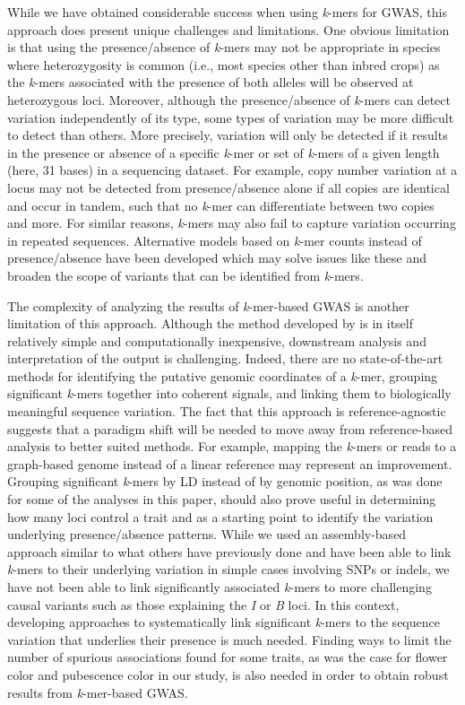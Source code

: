 While we have obtained considerable success when using \emph{k}-mers for GWAS, this
approach does present unique challenges and limitations. One obvious limitation
is that using the presence/absence of \emph{k}-mers may not be appropriate in
species where heterozygosity is common (i.e., most species other than inbred
crops) as the \emph{k}-mers associated with the presence of both alleles will
be observed at heterozygous loci. Moreover, although the presence/absence of
\emph{k}-mers can detect variation independently of its type, some types of
variation may be more difficult to detect than others. More precisely,
variation will only be detected if it results in the presence or absence of a
specific \emph{k}-mer or set of \emph{k}-mers of a given length (here, 31 bases) in a
sequencing dataset. For example, copy number variation at a locus may not be
detected from presence/absence alone if all copies are identical and occur in
tandem, such that no \textit{k}-mer can differentiate between two copies and
more. For similar reasons, \emph{k}-mers may also fail to capture variation
occurring in repeated sequences. Alternative models based on \emph{k}-mer
counts instead of presence/absence have been developed \citep{rahman2018,
he2021} which may solve issues like these and broaden the scope of variants
that can be identified from \emph{k}-mers.

The complexity of analyzing the results of \emph{k}-mer-based GWAS is
another limitation of this approach. Although the method developed by
\cite{voichek2020} is in itself relatively simple and computationally
inexpensive, downstream analysis and interpretation of the output is
challenging. Indeed, there are no state-of-the-art methods for identifying the
putative genomic coordinates of a \emph{k}-mer, grouping significant
\emph{k}-mers together into coherent signals, and linking them to biologically
meaningful sequence variation. The fact that this approach is
reference-agnostic suggests that a paradigm shift will be needed to move away
from reference-based analysis to better suited methods. For example, mapping
the \emph{k}-mers or reads to a graph-based genome \citep[using e.g. the vg
toolkit;][]{siren2021} instead of a linear reference may represent an
improvement. Grouping significant \emph{k}-mers by LD instead of by genomic
position, as was done for some of the analyses in this paper, should also prove
useful in determining how many loci control a trait and as a starting point to
identify the variation underlying presence/absence patterns. While we used an
assembly-based approach similar to what others have previously done
\citep[e.g.][]{voichek2020, rahman2018} and have been able to link
\emph{k}-mers to their underlying variation in simple cases involving SNPs or
indels, we have not been able to link significantly associated \emph{k}-mers to
more challenging causal variants such as those explaining the \emph{I} or
\emph{B} loci. In this context, developing approaches to systematically link
significant \emph{k}-mers to the sequence variation that underlies their
presence is much needed. Finding ways to limit the number of spurious
associations found for some traits, as was the case for flower color and
pubescence color in our study, is also needed in order to obtain robust results
from \emph{k}-mer-based GWAS.

